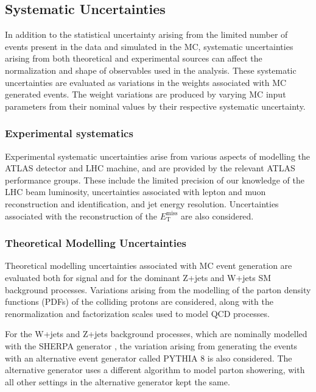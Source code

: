 \documentclass[12pt]{article}
\newcommand*{\met}{\ensuremath{E_\text{T}^\text{miss}} }
\begin{document}
\subsection{Systematic Uncertainties}

In addition to the statistical uncertainty arising from the limited number of events present in the data and simulated in the MC, systematic uncertainties arising from both theoretical and experimental sources can affect the normalization and shape of observables used in the analysis. These systematic uncertainties are evaluated as variations in the weights associated with MC generated events. The weight variations are produced by varying MC input parameters from their nominal values by their respective systematic uncertainty. 

\subsubsection{Experimental systematics}

Experimental systematic uncertainties arise from various aspects of modelling the ATLAS detector and LHC machine, and are provided by the relevant ATLAS performance groups. These include the limited precision of our knowledge of the LHC beam luminosity, uncertainties associated with lepton and muon reconstruction and identification, and jet energy resolution. Uncertainties associated with the reconstruction of the \met are also considered. 

\subsubsection{Theoretical Modelling Uncertainties}

Theoretical modelling uncertainties associated with MC event generation are evaluated both for signal and for the dominant Z+jets and W+jets SM background processes. Variations arising from the modelling of the parton density functions (PDFs) \cite{PDG_PDF} of the colliding protons are considered, along with the renormalization and factorization scales \cite{PDG_QCD} used to model QCD processes. 

For the W+jets and Z+jets background processes, which are nominally modelled with the SHERPA generator \cite{SHERPA}, the variation arising from generating the events with an alternative event generator called PYTHIA 8 \cite{PYTHIA8} is also considered. The alternative generator uses a different algorithm to model parton showering, with all other settings in the alternative generator kept the same. 
\end{document}
